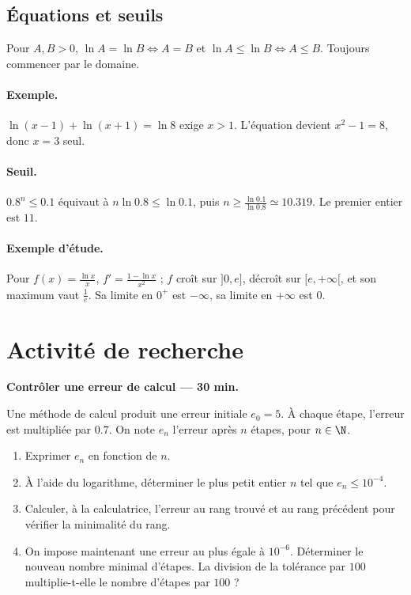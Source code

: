 \subsection{Équations et seuils}
Pour $A,B>0$, $\ln A=\ln B\Leftrightarrow A=B$ et $\ln A\le\ln B\Leftrightarrow A\le B$. Toujours commencer par le domaine.
\paragraph{Exemple.} $\ln(x-1)+\ln(x+1)=\ln8$ exige $x>1$. L'équation devient $x^2-1=8$, donc $x=3$ seul.
\paragraph{Seuil.} $\num{0,8}^n\le\num{0,1}$ équivaut à $n\ln\num{0,8}\le\ln\num{0,1}$, puis $n\ge\frac{\ln \num{0,1}}{\ln \num{0,8}}\simeq\num{10,319}$. Le premier entier est $11$.
\paragraph{Exemple d'étude.} Pour $f(x)=\frac{\ln x}{x}$, $f'=\frac{1-\ln x}{x^2}$ ; $f$ croît sur $]0,e]$, décroît sur $[e,+\infty[$, et son maximum vaut $\frac{1}{e}$. Sa limite en $0^+$ est $-\infty$, sa limite en $+\infty$ est $0$.


\begin{center}\end{center}

\mxnewpage
\section{Activité de recherche}\textbf{Contrôler une erreur de calcul --- 30 min.}\par Une méthode de calcul produit une erreur initiale $e_0=5$. À chaque étape, l'erreur est multipliée par $\num{0,7}$. On note $e_n$ l'erreur après $n$ étapes, pour $n\in\N$.
\begin{enumerate}\item Exprimer $e_n$ en fonction de $n$.
\item À l'aide du logarithme, déterminer le plus petit entier $n$ tel que $e_n\le10^{-4}$.
\item Calculer, à la calculatrice, l'erreur au rang trouvé et au rang précédent pour vérifier la minimalité du rang.
\item On impose maintenant une erreur au plus égale à $10^{-6}$. Déterminer le nouveau nombre minimal d'étapes. La division de la tolérance par $100$ multiplie-t-elle le nombre d'étapes par $100$ ?\end{enumerate}

